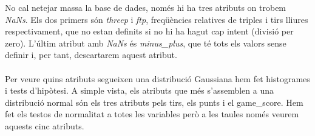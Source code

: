 \documentclass{article}
\begin{document}
No cal netejar massa la base de dades, només hi ha tres atributs on trobem \textit{NaNs}. Els dos primers són \textit{threep} i \textit{ftp}, freqüències relatives de triples i tirs lliures respectivament, que no estan definits si no hi ha hagut cap intent (divisió per zero). L'últim atribut amb \textit{NaNs} és \textit{minus\_plus}, que té tots els valors sense definir i, per tant, descartarem aquest atribut.
\\
\\
Per veure quins atributs segueixen una distribució Gaussiana hem fet histogrames i tests d'hipòtesi.
A simple vista, els atributs que més s'assemblen a una distribució normal són els tres atributs pels tirs, els punts i el game\_score. Hem fet els testos de normalitat a totes les variables però a les taules només veurem aquests cinc atributs.
\\
\end{document}
